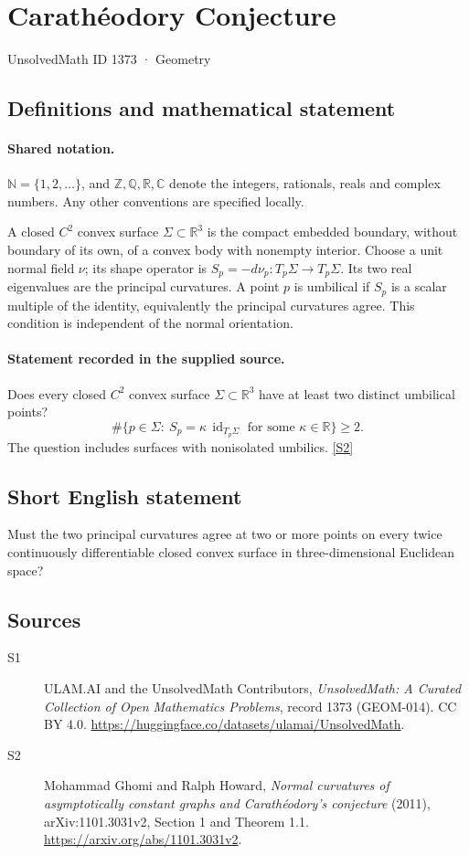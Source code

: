 \documentclass[11pt]{article}
\newcommand{\sref}[2]{\hyperlink{source:#1:#2}{[S#2]}}
\begin{document}
\setcounter{section}{1372}
\section{Carathéodory Conjecture}\label{1373}
{\small\sffamily UnsolvedMath ID 1373 · Geometry}
\subsection{Definitions and mathematical statement}

\paragraph{Shared notation.}$\mathbb N=\{1,2,\ldots\}$, and $\mathbb Z,\mathbb Q,\mathbb R,\mathbb C$ denote the integers, rationals, reals and complex numbers. Any other conventions are specified locally.


A closed $C^2$ convex surface $\Sigma\subset\mathbb R^3$ is the compact embedded boundary, without boundary of its own, of a convex body with nonempty interior. Choose a unit normal field $\nu$; its shape operator is $S_p=-d\nu_p:T_p\Sigma\to T_p\Sigma$. Its two real eigenvalues are the principal curvatures. A point $p$ is umbilical if $S_p$ is a scalar multiple of the identity, equivalently the principal curvatures agree. This condition is independent of the normal orientation.
\paragraph{Statement recorded in the supplied source.}
Does every closed $C^2$ convex surface $\Sigma\subset\mathbb R^3$ have at least two distinct umbilical points?
\[
 \#\{p\in\Sigma:\ S_p=\kappa\,\operatorname{id}_{T_p\Sigma}\text{ for some }\kappa\in\mathbb R\}\ge2.
\]
The question includes surfaces with nonisolated umbilics. \sref{1373}{2}
\subsection{Short English statement}
Must the two principal curvatures agree at two or more points on every twice continuously differentiable closed convex surface in three-dimensional Euclidean space?
\subsection{Sources}
\begin{description}
\item[\hypertarget{source:1373:1}{S1}] ULAM.AI and the UnsolvedMath Contributors, \emph{UnsolvedMath: A Curated Collection of Open Mathematics Problems}, record 1373 (GEOM-014). CC BY 4.0. \url{https://huggingface.co/datasets/ulamai/UnsolvedMath}.
\item[\hypertarget{source:1373:2}{S2}] Mohammad Ghomi and Ralph Howard, \emph{Normal curvatures of asymptotically constant graphs and Carathéodory's conjecture} (2011), arXiv:1101.3031v2, Section 1 and Theorem 1.1. \url{https://arxiv.org/abs/1101.3031v2}.
\end{description}
\label{end:1373}
\end{document}
